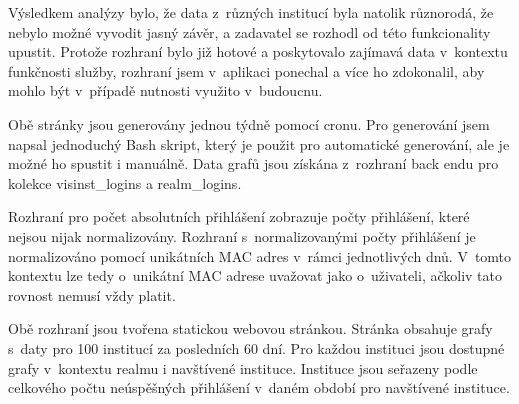 \documentclass[thesis=M,czech]{FITthesis}[2012/06/26]
\begin{document}
      Výsledkem analýzy bylo, že data z~různých institucí byla natolik různorodá, že nebylo možné vyvodit jasný
      závěr, a zadavatel se rozhodl od této funkcionality upustit.
      Protože rozhraní bylo již hotové a poskytovalo zajímavá data v~kontextu
      funkčnosti služby, rozhraní jsem v~aplikaci ponechal a více ho zdokonalil,
      aby mohlo být v~případě nutnosti využito v~budoucnu.
 
      Obě stránky jsou generovány jednou týdně pomocí cronu.
      Pro generování jsem napsal jednoduchý Bash skript,
      který je použit pro automatické generování, ale je možné ho spustit i manuálně.
      Data grafů jsou získána z~rozhraní back endu pro kolekce visinst\_logins a realm\_logins.
      
      Rozhraní pro počet absolutních přihlášení zobrazuje počty přihlášení,
      které nejsou nijak normalizovány.
      Rozhraní s~normalizovanými počty přihlášení je normalizováno pomocí
      unikátních MAC adres v~rámci jednotlivých dnů. 
      V~tomto kontextu lze tedy o~unikátní MAC adrese uvažovat jako o~uživateli,
      ačkoliv tato rovnost nemusí vždy platit.
      
      Obě rozhraní jsou tvořena statickou webovou stránkou.
      Stránka obsahuje grafy s~daty pro 100 institucí za posledních 60 dní.
      Pro každou instituci jsou dostupné grafy v~kontextu realmu i navštívené instituce.
      Instituce jsou seřazeny podle celkového počtu neúspěšných přihlášení v~daném období
      pro navštívené instituce.



\end{document}
